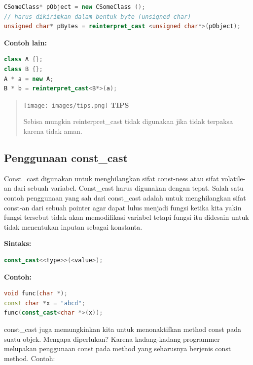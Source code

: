 \begin{lstlisting}[language=c++, numbers=none]
CSomeClass* pObject = new CSomeClass ();
// harus dikirimkan dalam bentuk byte (unsigned char)
unsigned char* pBytes = reinterpret_cast <unsigned char*>(pObject);
\end{lstlisting}

\textbf{Contoh lain:}

\begin{lstlisting}[language=c++, numbers=none]
class A {};
class B {};
A * a = new A;
B * b = reinterpret_cast<B*>(a);
\end{lstlisting}

\begin{quotation}
\texttt{[image: images/tips.png]} \textbf{TIPS} 

Sebisa
mungkin reinterpret\_cast tidak digunakan jika tidak terpaksa karena
tidak aman.
\end{quotation}


\subsection{Penggunaan const\_cast}\label{penggunaan-constux5fcast}

Const\_cast digunakan untuk menghilangkan sifat const-ness atau sifat
volatile-an dari sebuah variabel. Const\_cast harus digunakan dengan
tepat. Salah satu contoh penggunaan yang sah dari const\_cast adalah
untuk menghilangkan sifat const-an dari sebuah pointer agar dapat lulus
menjadi fungsi ketika kita yakin fungsi tersebut tidak akan memodifikasi
variabel tetapi fungsi itu didesain untuk tidak menentukan inputan
sebagai konstanta.

\textbf{Sintaks:}

\begin{lstlisting}[language=c++, numbers=none]
const_cast<<type>>(<value>);
\end{lstlisting}

\textbf{Contoh:}

\begin{lstlisting}[language=c++, numbers=none]
void func(char *);
const char *x = "abcd";
func(const_cast<char *>(x));
\end{lstlisting}

const\_cast juga memungkinkan kita untuk menonaktifkan method const pada
suatu objek. Mengapa diperlukan? Karena kadang-kadang programmer
melupakan penggunaan const pada method yang seharusnya berjenis const
method. Contoh:


